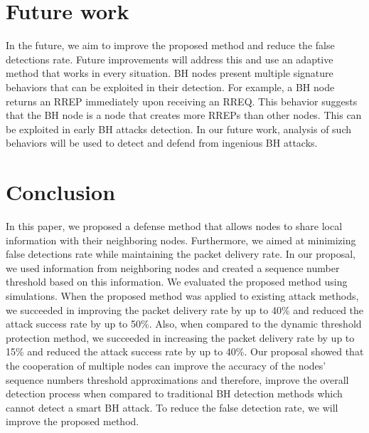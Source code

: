 \documentclass[conference]{IEEEtran}
\begin{document}
\section{Future work}
In the future, we aim to improve the proposed method and reduce the false detections rate. Future improvements will address this and use an adaptive method that works in every situation. BH nodes present multiple signature behaviors that can be exploited in their detection. For example, a BH node returns an RREP immediately upon receiving an RREQ. This behavior suggests that the BH node is a node that creates more RREPs than other nodes. This can be exploited in early BH attacks detection. In our future work, analysis of such behaviors will be used to detect and defend from ingenious BH attacks.

\section{Conclusion}
In this paper, we proposed a defense method that allows nodes to share local information with their neighboring nodes. Furthermore, we aimed at minimizing false detections rate while maintaining the packet delivery rate. In our proposal, we used information from neighboring nodes and created a sequence number threshold based on this information. We evaluated the proposed method using simulations. When the proposed method was applied to existing attack methods, we succeeded in improving the packet delivery rate by up to 40\% and reduced the attack success rate by up to 50\%. Also, when compared to the dynamic threshold protection method, we succeeded in increasing the packet delivery rate by up to 15\% and reduced the attack success rate by up to 40\%. Our proposal showed that the cooperation of multiple nodes can improve the accuracy of the nodes' sequence numbers threshold approximations and therefore, improve the overall detection process when compared to traditional BH detection methods which cannot detect a smart BH attack. To reduce the false detection rate, we will improve the proposed method.




\end{document}
